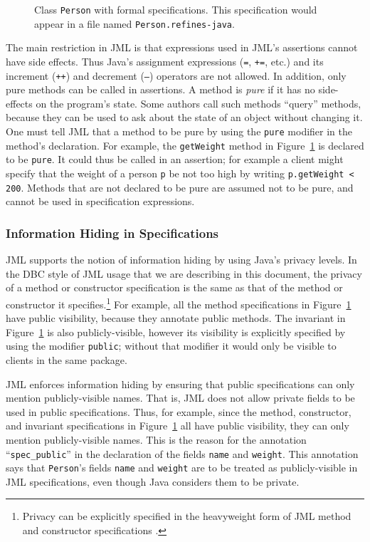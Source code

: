 \documentclass[twocolumn]{article}
\begin{document}
\begin{figure}

\caption{Class \texttt{Person} with formal specifications.  This
  specification would appear in a file named \texttt{Person.refines-java}.}
\label{fig-formal-spec}
\end{figure}

The main restriction in JML is that expressions used in JML's
assertions cannot have side effects. Thus Java's assignment
expressions (\texttt{=}, \texttt{+=}, etc.) and its increment
(\texttt{++}) and decrement (\texttt{--}) operators are not
allowed. In addition, only pure methods can be called in assertions.
A method is \emph{pure} if it has no side-effects on the program's
state. Some authors call such methods ``query'' methods, because they
can be used to ask about the state of an object without changing it.
One must tell JML that a method to be pure by using the
\texttt{pure} modifier in the method's declaration.
For example, the \texttt{getWeight} method in
Figure~\ref{fig-formal-spec} is declared to be \texttt{pure}.
It could thus be called in an assertion; for example a client might
specify that the weight of a person \texttt{p} be not too high by writing
\texttt{p.getWeight < 200}.
Methods that are not declared to be pure are assumed not to be pure,
and cannot be used in specification expressions.

\subsubsection{Information Hiding in Specifications}

JML supports the notion of information hiding by using
Java's privacy levels.
In the DBC style of JML usage that we are describing in this document,
the privacy of a method or constructor specification is the
same as that of the method or constructor it specifies.\footnote{
Privacy can be explicitly specified in the
heavyweight form of JML method and constructor specifications
\cite{Leavens-Baker-Ruby06}.}
For example, all the method specifications in Figure~\ref{fig-formal-spec}
have public visibility, because they annotate public methods.
The invariant in Figure~\ref{fig-formal-spec} is also
publicly-visible, however its visibility is explicitly specified by using
the modifier \texttt{public}; without that modifier it would only be
visible to clients in the same package.

JML enforces information hiding by ensuring that public specifications
can only mention publicly-visible names.
That is, JML does not allow private fields to be used in public
specifications. 
Thus, for example, since the method, constructor, and invariant
specifications in Figure~\ref{fig-formal-spec} all have public
visibility, they can only mention publicly-visible names.  This is the
reason for the annotation ``\texttt{spec\_public}''
in the declaration of the fields \texttt{name} and \texttt{weight}.
This annotation says that \texttt{Person}'s fields \texttt{name} and
\texttt{weight} are to be treated as publicly-visible in JML
specifications, even though Java considers them to be private.
\end{document}
